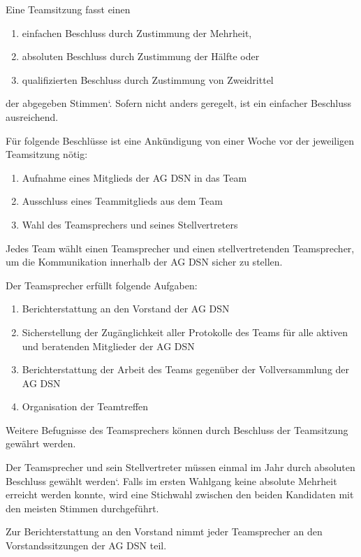 \begin{contract}
Eine Teamsitzung fasst einen
\begin{enumerate}
  \item einfachen Beschluss durch Zustimmung der Mehrheit,
  \item absoluten Beschluss durch Zustimmung der Hälfte oder
  \item qualifizierten Beschluss durch Zustimmung von Zweidrittel
\end{enumerate}
der abgegeben Stimmen`. Sofern nicht anders geregelt, ist ein einfacher Beschluss ausreichend.

Für folgende Beschlüsse ist eine Ankündigung von einer Woche vor der jeweiligen Teamsitzung nötig:
\begin{enumerate}
  \item Aufnahme eines Mitglieds der AG DSN in das Team
  \item Ausschluss eines Teammitglieds aus dem Team
  \item Wahl des Teamsprechers und seines Stellvertreters
\end{enumerate}


Jedes Team wählt einen Teamsprecher und einen stellvertretenden Teamsprecher, um die Kommunikation innerhalb der AG DSN sicher zu stellen.

Der Teamsprecher erfüllt folgende Aufgaben:
\begin{enumerate}
  \item Berichterstattung an den Vorstand der AG DSN
  \item Sicherstellung der Zugänglichkeit aller Protokolle des Teams für alle aktiven und beratenden Mitglieder der AG DSN
  \item Berichterstattung der Arbeit des Teams gegenüber der Vollversammlung der AG DSN
  \item Organisation der Teamtreffen
\end{enumerate}

Weitere Befugnisse des Teamsprechers können durch Beschluss der Teamsitzung gewährt werden.

Der Teamsprecher und sein Stellvertreter müssen einmal im Jahr durch absoluten Beschluss gewählt werden`. Falls im ersten Wahlgang keine absolute Mehrheit erreicht werden konnte, wird eine Stichwahl zwischen den beiden Kandidaten mit den meisten Stimmen durchgeführt.

Zur Berichterstattung an den Vorstand nimmt jeder Teamsprecher an den Vorstandssitzungen der AG DSN teil.


\end{contract}
